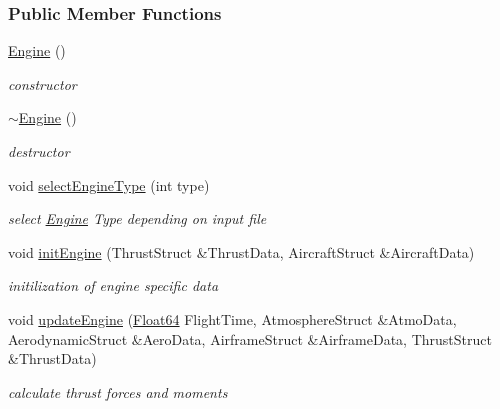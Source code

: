 \subsubsection*{Public Member Functions}
\begin{DoxyCompactItemize}
\item 
\mbox{\label{group___engine_a8c98683b0a3aa28d8ab72a8bcd0d52f2}} 
\hyperlink{group___engine_a8c98683b0a3aa28d8ab72a8bcd0d52f2}{Engine} ()
\begin{DoxyCompactList}\small\item\em constructor \end{DoxyCompactList}\item 
\mbox{\label{group___engine_a8ef7030a089ecb30bbfcb9e43094717a}} 
\hyperlink{group___engine_a8ef7030a089ecb30bbfcb9e43094717a}{$\sim$\+Engine} ()
\begin{DoxyCompactList}\small\item\em destructor \end{DoxyCompactList}\item 
void \hyperlink{group___engine_ac33371d6fff86c0c8e14495f10046d9a}{select\+Engine\+Type} (int type)
\begin{DoxyCompactList}\small\item\em select \hyperlink{group___engine_class_engine}{Engine} Type depending on input file \end{DoxyCompactList}\item 
\mbox{\label{group___engine_aee607dba02101af5b299920f89b56e79}} 
void \hyperlink{group___engine_aee607dba02101af5b299920f89b56e79}{init\+Engine} (Thrust\+Struct \&Thrust\+Data, Aircraft\+Struct \&Aircraft\+Data)
\begin{DoxyCompactList}\small\item\em initilization of engine specific data \end{DoxyCompactList}\item 
void \hyperlink{group___engine_a9e16100ffd33cf8ec632257795c03865}{update\+Engine} (\hyperlink{group___tools_ga3f1431cb9f76da10f59246d1d743dc2c}{Float64} Flight\+Time, Atmosphere\+Struct \&Atmo\+Data, Aerodynamic\+Struct \&Aero\+Data, Airframe\+Struct \&Airframe\+Data, Thrust\+Struct \&Thrust\+Data)
\begin{DoxyCompactList}\small\item\em calculate thrust forces and moments \end{DoxyCompactList}\end{DoxyCompactItemize}


